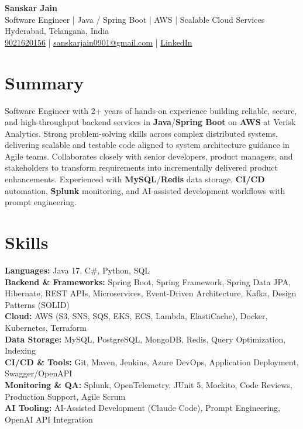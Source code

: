\documentclass[a4paper,10pt]{article}
\begin{document}
\begin{center}
    {\LARGE \textbf{Sanskar Jain}} \\
    Software Engineer \;|\; Java / Spring Boot \;|\; AWS \;|\; Scalable Cloud Services \\
    Hyderabad, Telangana, India \\
    \href{tel:9021620156}{9021620156} \;|\;
    \href{mailto:sanskarjain0901@gmail.com}{sanskarjain0901@gmail.com} \;|\;
    \href{https://www.linkedin.com/in/sanskar-jain0901/}{LinkedIn}
\end{center}

\vspace{3pt}

\section*{Summary}
Software Engineer with 2+ years of hands-on experience building reliable, secure, and high-throughput backend services in \textbf{Java}/\textbf{Spring Boot} on \textbf{AWS} at Verisk Analytics.
Strong problem-solving skills across complex distributed systems, delivering scalable and testable code aligned to system architecture guidance in Agile teams.
Collaborates closely with senior developers, product managers, and stakeholders to transform requirements into incrementally delivered product enhancements.
Experienced with \textbf{MySQL}/\textbf{Redis} data storage, \textbf{CI/CD} automation, \textbf{Splunk} monitoring, and AI-assisted development workflows with prompt engineering.

\section*{Skills}
\textbf{Languages:} Java 17, C\#, Python, SQL \\
\textbf{Backend \& Frameworks:} Spring Boot, Spring Framework, Spring Data JPA, Hibernate, REST APIs, Microservices, Event-Driven Architecture, Kafka, Design Patterns (SOLID) \\
\textbf{Cloud:} AWS (S3, SNS, SQS, EKS, ECS, Lambda, ElastiCache), Docker, Kubernetes, Terraform \\
\textbf{Data Storage:} MySQL, PostgreSQL, MongoDB, Redis, Query Optimization, Indexing \\
\textbf{CI/CD \& Tools:} Git, Maven, Jenkins, Azure DevOps, Application Deployment, Swagger/OpenAPI \\
\textbf{Monitoring \& QA:} Splunk, OpenTelemetry, JUnit 5, Mockito, Code Reviews, Production Support, Agile Scrum \\
\textbf{AI Tooling:} AI-Assisted Development (Claude Code), Prompt Engineering, OpenAI API Integration
\end{document}
